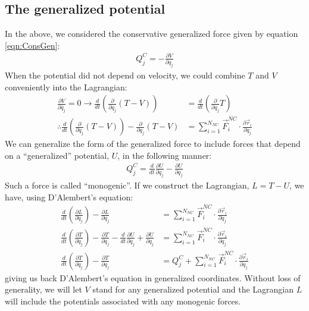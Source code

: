 \subsection{The generalized potential}
In the above, we considered the conservative generalized force given by equation \ref{eqn:ConsGen}:
\begin{align*}
Q_j^C=-\frac{\partial V}{\partial q_j}
\end{align*}
When the potential did not depend on velocity, we could combine $T$ and $V$ conveniently into the Lagrangian:
\begin{align*}
\frac{\partial V}{\partial \dot{q}_j}=0 \to \frac{d}{dt}\left(\frac{\partial }{\partial \dot{q}_j}(T-V) \right) &=\frac{d}{dt}\left(\frac{\partial }{\partial \dot{q}_j} T \right)\nonumber\\
\therefore \frac{d}{dt}\left(\frac{\partial }{\partial \dot{q}_j} (T-V) \right) - \frac{\partial }{\partial q_j}(T-V)&=\sum_{i=1}^{N_{NC}}\vec{F}_i^{NC}\cdot\frac{\partial\vec{r}_i}{\partial q_j}
\end{align*} 
We can generalize the form of the generalized force to include forces that depend on a ``generalized'' potential, $U$, in the following manner:
\begin{align*}
Q_j^C=\frac{d}{dt}\frac{\partial U}{\partial \dot{q}_j}-\frac{\partial U}{\partial q_j}
\end{align*}
Such a force is called ``monogenic''. If we construct the Lagrangian, $L=T-U$, we have, using D'Alembert's equation:
\begin{align*}
\frac{d}{dt}\left(\frac{\partial L}{\partial \dot{q}_j} \right) - \frac{\partial L}{\partial q_j}&=\sum_{i=1}^{N_{NC}}\vec{F}_i^{NC}\cdot\frac{\partial\vec{r}_i}{\partial q_j}\nonumber\\
\frac{d}{dt}\left(\frac{\partial T}{\partial \dot{q}_j} \right) - \frac{\partial T}{\partial q_j}-\frac{d}{dt}\frac{\partial U}{\partial \dot{q}_j}+\frac{\partial U}{\partial q_j}&=\sum_{i=1}^{N_{NC}}\vec{F}_i^{NC}\cdot\frac{\partial\vec{r}_i}{\partial q_j}\nonumber\\
\frac{d}{dt}\left(\frac{\partial T}{\partial \dot{q}_j} \right) - \frac{\partial T}{\partial q_j}&=Q_j^C+\sum_{i=1}^{N_{NC}}\vec{F}_i^{NC}\cdot\frac{\partial\vec{r}_i}{\partial q_j}
\end{align*}
giving us back D'Alembert's equation in generalized coordinates. Without loss of generality, we will let $V$ stand for any generalized potential and the Lagrangian $L$ will include the potentials associated with any monogenic forces. 

